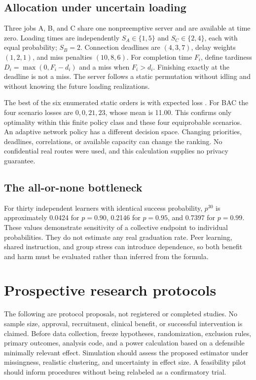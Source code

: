 \subsection{Allocation under uncertain loading}
Three jobs A, B, and C share one nonpreemptive server and are available at time zero. Loading times are independently $S_A\in\{1,5\}$ and $S_C\in\{2,4\}$, each with equal probability; $S_B=2$. Connection deadlines are $(4,3,7)$, delay weights $(1,2,1)$, and miss penalties $(10,8,6)$. For completion time $F_i$, define tardiness $D_i=\max(0,F_i-d_i)$ and a miss when $F_i>d_i$. Finishing exactly at the deadline is not a miss. The server follows a static permutation without idling and without knowing the future loading realizations.


The best of the six enumerated static orders is \BestOrder{} with expected loss \BestLoss. For BAC the four scenario losses are $0,0,21,23$, whose mean is 11.00. This confirms only optimality within this finite policy class and these four equiprobable scenarios. An adaptive network policy has a different decision space. Changing priorities, deadlines, correlations, or available capacity can change the ranking. No confidential real routes were used, and this calculation supplies no privacy guarantee.

\subsection{The all-or-none bottleneck}
For thirty independent learners with identical success probability, $p^{30}$ is approximately 0.0424 for $p=0.90$, 0.2146 for $p=0.95$, and 0.7397 for $p=0.99$. These values demonstrate sensitivity of a collective endpoint to individual probabilities. They do not estimate any real graduation rate. Peer learning, shared instruction, and group stress can introduce dependence, so both benefit and harm must be evaluated rather than inferred from the formula.

\section{Prospective research protocols}
\label{sec:protocols}
The following are protocol proposals, not registered or completed studies. No sample size, approval, recruitment, clinical benefit, or successful intervention is claimed. Before data collection, freeze hypotheses, randomization, exclusion rules, primary outcomes, analysis code, and a power calculation based on a defensible minimally relevant effect. Simulation should assess the proposed estimator under missingness, realistic clustering, and uncertainty in effect size. A feasibility pilot should inform procedures without being relabeled as a confirmatory trial.

